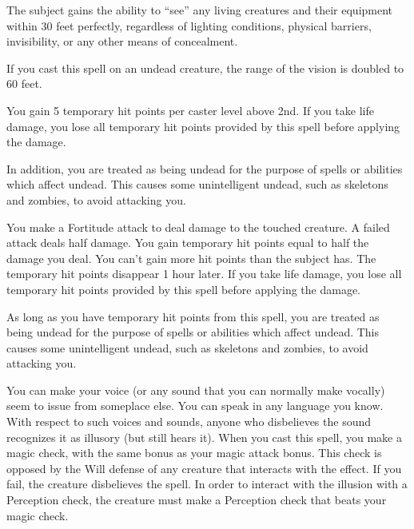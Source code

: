 \spelldur{\durlong \dismissable}
\spelleffect The subject gains the ability to ``see'' any living creatures and their equipment within 30 feet perfectly, regardless of lighting conditions, physical barriers, invisibility, or any other means of concealment.

If you cast this spell on an undead creature, the range of the vision is doubled to 60 feet.

\spelldur{\durlong}
\spelleffect You gain 5 temporary hit points  per caster level above 2nd. If you take life damage, you lose all temporary hit points provided by this spell before applying the damage.

In addition, you are treated as being undead for the purpose of spells or abilities which affect undead. This causes some unintelligent undead, such as skeletons and zombies, to avoid attacking you.

\spelleffect You make a Fortitude attack to deal damage to the touched creature. A failed attack deals half damage. You gain temporary hit points equal to half the damage you deal. You can't gain more hit points than the subject has. The temporary hit points disappear 1 hour later. If you take life damage, you lose all temporary hit points provided by this spell before applying the damage.

As long as you have temporary hit points from this spell, you are treated as being undead for the purpose of spells or abilities which affect undead. This causes some unintelligent undead, such as skeletons and zombies, to avoid attacking you.

\spellrng{\rngclose}
\spelldur{\durshort \dismissable}
\spelleffect You can make your voice (or any sound that you can normally make vocally) seem to issue from someplace else. You can speak in any language you know. With respect to such voices and sounds, anyone who disbelieves the sound recognizes it as illusory (but still hears it).
\spellnotes When you cast this spell, you make a magic check, with the same bonus as your magic attack bonus. This check is opposed by the Will defense of any creature that interacts with the effect. If you fail, the creature disbelieves the spell. In order to interact with the illusion with a Perception check, the creature must make a Perception check that beats your magic check.


